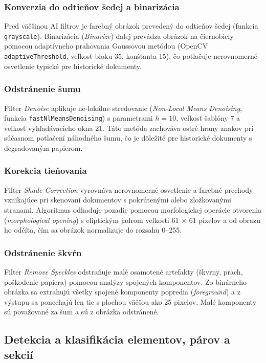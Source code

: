 \subsubsection{Konverzia do odtieňov šedej a binarizácia}

Pred väčšinou AI filtrov je farebný obrázok prevedený do odtieňov šedej (funkcia \texttt{grayscale}). Binarizácia (\textit{Binarize}) ďalej prevádza obrázok na čiernobiely pomocou adaptívneho prahovania Gaussovou metódou (OpenCV \texttt{adaptiveThreshold}, veľkosť bloku 35, konštanta 15), čo potlačuje nerovnomerné osvetlenie typické pre historické dokumenty.

\subsubsection{Odstránenie šumu}

Filter \textit{Denoise} aplikuje ne-lokálne stredovanie (\textit{Non-Local Means Denoising}, funkcia \texttt{fastNlMeansDenoising}) s parametrami $h=10$, veľkosť šablóny 7 a veľkosť vyhľadávacieho okna 21. Táto metóda zachováva ostré hrany znakov pri súčasnom potlačení náhodného šumu, čo je dôležité pre historické dokumenty s degradovaným papierom.

\subsubsection{Korekcia tieňovania}

Filter \textit{Shade Correction} vyrovnáva nerovnomerné osvetlenie a farebné prechody vznikajúce pri skenovaní dokumentov s pokrútenými alebo zložkovanými stranami. Algoritmus odhaduje pozadie pomocou morfologickej operácie otvorenia (\textit{morphological opening}) s eliptickým jadrom veľkosti 61 × 61 pixelov a od obrazu ho odčíta, čím sa obrázok normalizuje do rozsahu 0–255.

\subsubsection{Odstránenie škvŕn}

Filter \textit{Remove Speckles} odstraňuje malé osamotené artefakty (škvrny, prach, poškodenie papiera) pomocou analýzy spojených komponentov. Zo binárneho obrázka sa extrahujú všetky spojené komponenty popredia (\textit{foreground}) a z výstupu sa ponechajú len tie s plochou väčšou ako 25 pixelov. Malé komponenty sú považované za šum a sú z obrázka odstránené.

\subsection{Detekcia a klasifikácia elementov, párov a sekcií}

